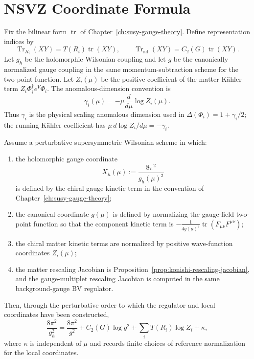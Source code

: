 \section{NSVZ Coordinate Formula}

Fix the bilinear form \(\operatorname{tr}\) of
Chapter~\ref{ch:susy-gauge-theory}.  Define representation indices by
\[
  \operatorname{Tr}_{R_i}(XY)=T(R_i)\operatorname{tr}(XY),
  \qquad
  \operatorname{Tr}_{\mathrm{ad}}(XY)=C_2(G)\operatorname{tr}(XY).
\]
Let \(g_h\) be the holomorphic Wilsonian coupling and let \(g\) be the
canonically normalized gauge coupling in the same momentum-subtraction
scheme for the two-point function.  Let \(Z_i(\mu)\) be the positive
coefficient of the matter Kähler term
\(Z_i\Phi_i^\dagger e^V\Phi_i\).  The anomalous-dimension convention is
\[
  \gamma_i(\mu)=-\mu\frac{d}{d\mu}\log Z_i(\mu).
\]
Thus \(\gamma_i\) is the physical scaling anomalous dimension used in
\(\Delta(\Phi_i)=1+\gamma_i/2\); the running Kähler coefficient has
\(\mu\,d\log Z_i/d\mu=-\gamma_i\).

\begin{proposition}
\label{prop:nsvz-coordinate-relation-derived}
Assume a perturbative supersymmetric Wilsonian scheme in which:
\begin{enumerate}[label=(\roman*)]
\item the holomorphic gauge coordinate
\[
  X_h(\mu):=\frac{8\pi^2}{g_h(\mu)^2}
\]
is defined by the chiral gauge kinetic term in the convention of
Chapter~\ref{ch:susy-gauge-theory};
\item the canonical coordinate \(g(\mu)\) is defined by normalizing the
gauge-field two-point function so that the component kinetic term is
\(-\frac{1}{4g(\mu)^2}\operatorname{tr}(F_{\mu\nu}F^{\mu\nu})\);
\item the chiral matter kinetic terms are normalized by positive
wave-function coordinates \(Z_i(\mu)\);
\item the matter rescaling Jacobian is
Proposition~\ref{prop:konishi-rescaling-jacobian}, and the gauge-multiplet
rescaling Jacobian is computed in the same background-gauge BV regulator.
\end{enumerate}
Then, through the perturbative order to which the regulator and local
coordinates have been constructed,
\[
  \frac{8\pi^2}{g_h^2}
  =
  \frac{8\pi^2}{g^2}
  +
  C_2(G)\log g^2
  +
  \sum_i T(R_i)\log Z_i
  +
  \kappa ,
\]
where \(\kappa\) is independent of \(\mu\) and records finite choices of
reference normalization for the local coordinates.
\end{proposition}

